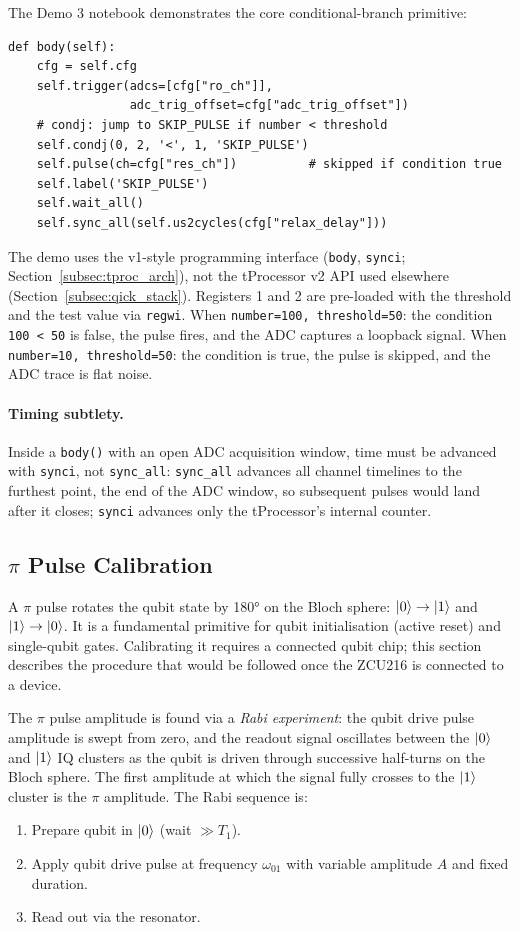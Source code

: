 The \QICK{} Demo 3 notebook demonstrates the core conditional-branch primitive:
\begin{verbatim}
def body(self):
    cfg = self.cfg
    self.trigger(adcs=[cfg["ro_ch"]],
                 adc_trig_offset=cfg["adc_trig_offset"])
    # condj: jump to SKIP_PULSE if number < threshold
    self.condj(0, 2, '<', 1, 'SKIP_PULSE')
    self.pulse(ch=cfg["res_ch"])          # skipped if condition true
    self.label('SKIP_PULSE')
    self.wait_all()
    self.sync_all(self.us2cycles(cfg["relax_delay"]))
\end{verbatim}

The demo uses the v1-style programming interface (\texttt{body}, \texttt{synci};
Section~\ref{subsec:tproc_arch}), not the tProcessor v2 API used elsewhere
(Section~\ref{subsec:qick_stack}).  Registers 1 and 2 are pre-loaded with the threshold and the test value via
\texttt{regwi}.  When \texttt{number=100, threshold=50}: the condition
\texttt{100 < 50} is false, the pulse fires, and the ADC captures a loopback
signal.  When \texttt{number=10, threshold=50}: the condition is true, the pulse
is skipped, and the ADC trace is flat noise.

\paragraph{Timing subtlety.}
Inside a \texttt{body()} with an open ADC acquisition window, time must be
advanced with \texttt{synci}, not \texttt{sync\_all}: \texttt{sync\_all} advances
all channel timelines to the furthest point, the end of the ADC window, so
subsequent pulses would land after it closes; \texttt{synci} advances only the
tProcessor's internal counter.

\subsection{\texorpdfstring{$\pi$}{π} Pulse Calibration}
\label{subsec:pi_pulse}

A $\pi$ pulse rotates the qubit state by 180° on the Bloch sphere:
$\ket{0} \to \ket{1}$ and $\ket{1} \to \ket{0}$.  It is a fundamental primitive
for qubit initialisation (active reset) and single-qubit gates.  Calibrating it
requires a connected qubit chip; this section describes the procedure that would
be followed once the ZCU216 is connected to a device.

The $\pi$ pulse amplitude is found via a \emph{Rabi experiment}: the qubit drive
pulse amplitude is swept from zero, and the readout signal oscillates between the
$\ket{0}$ and $\ket{1}$ IQ clusters as the qubit is driven through successive
half-turns on the Bloch sphere.  The first amplitude at which the signal fully
crosses to the $\ket{1}$ cluster is the $\pi$ amplitude.  The Rabi sequence is:
\begin{enumerate}
  \item Prepare qubit in $\ket{0}$ (wait $\gg T_1$).
  \item Apply qubit drive pulse at frequency $\omega_{01}$ with variable amplitude
        $A$ and fixed duration.
  \item Read out via the resonator.
\end{enumerate}

